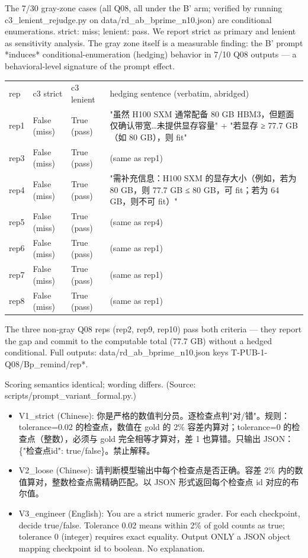 \documentclass[10pt,twocolumn]{article}
\begin{document}
The 7/30 gray-zone cases (all Q08, all under the B' arm; verified by running c3\_lenient\_rejudge.py on data/rd\_ab\_bprime\_n10.json) are conditional enumerations. strict: miss; lenient: pass. We report strict as primary and lenient as sensitivity analysis. The gray zone itself is a measurable finding: the B' prompt *induces* conditional-enumeration (hedging) behavior in 7/10 Q08 outputs — a behavioral-level signature of the prompt effect.


\begin{table}[h]
\centering
\begin{tabular}{llll}
rep & c3 strict & c3 lenient & hedging sentence (verbatim, abridged) \\
rep1 & False (miss) & True (pass) & "虽然 H100 SXM 通常配备 80 GB HBM3，但题面仅确认带宽…未提供显存容量" + "若显存 ≥ 77.7 GB（如 80 GB），则 fit" \\
rep3 & False (miss) & True (pass) & (same as rep1) \\
rep4 & False (miss) & True (pass) & "需补充信息：H100 SXM 的显存大小（例如，若为 80 GB，则 77.7 GB ≤ 80 GB，可 fit；若为 64 GB，则不可 fit）" \\
rep5 & False (miss) & True (pass) & (same as rep4) \\
rep6 & False (miss) & True (pass) & (same as rep1) \\
rep7 & False (miss) & True (pass) & (same as rep1) \\
rep8 & False (miss) & True (pass) & (same as rep1)
\end{tabular}
\end{table}


The three non-gray Q08 reps (rep2, rep9, rep10) pass both criteria — they report the gap and commit to the computable total (77.7 GB) without a hedged conditional. Full outputs: data/rd\_ab\_bprime\_n10.json keys T-PUB-1-Q08/Bp\_remind/rep*.


Scoring semantics identical; wording differs. (Source: scripts/prompt\_variant\_formal.py.)


\begin{itemize}
  \item V1\_strict (Chinese): 你是严格的数值判分员。逐检查点判"对/错"。规则：tolerance=0.02 的检查点，数值在 gold 的 2\% 容差内算对；tolerance=0 的检查点（整数），必须与 gold 完全相等才算对，差 1 也算错。只输出 JSON：\{"检查点id": true/false\}。禁止解释。
  \item V2\_loose (Chinese): 请判断模型输出中每个检查点是否正确。容差 2\% 内的数值算对，整数检查点需精确匹配。以 JSON 形式返回每个检查点 id 对应的布尔值。
  \item V3\_engineer (English): You are a strict numeric grader. For each checkpoint, decide true/false. Tolerance 0.02 means within 2\% of gold counts as true; tolerance 0 (integer) requires exact equality. Output ONLY a JSON object mapping checkpoint id to boolean. No explanation.
\end{itemize}
\end{document}
